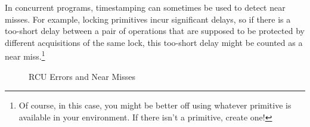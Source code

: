 In concurrent programs, timestamping can sometimes be used to detect
near misses.
For example, locking primitives incur significant delays, so if there is
a too-short delay between a pair of operations that are supposed
to be protected by different acquisitions of the same lock, this too-short
delay might be counted as a near miss.\footnote{
	Of course, in this case, you might be better off using
	whatever  primitive is available
	in your environment.
	If there isn't a  primitive, create one!}

\begin{figure}[tbp]
\centering
{}
\caption{RCU Errors and Near Misses}
\label{fig:debugging:RCU Errors and Near Misses}
\end{figure}

